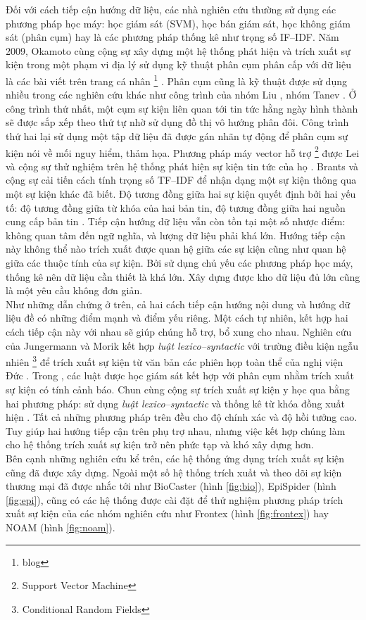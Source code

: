 \noindent Đối với  cách tiếp cận hướng dữ liệu, các nhà nghiên cứu thường sử dụng các phương pháp học máy: học giám sát (SVM), học bán giám sát, học không giám sát (phân cụm) hay là các  phương pháp thống kê như trọng số IF--IDF. Năm 2009, Okamoto cùng cộng sự xây dựng một hệ thống phát hiện và trích xuất sự kiện trong một phạm vi địa lý sử dụng kỹ thuật  phân cụm phân cấp với dữ liệu là các bài viết trên trang cá nhân \footnote{blog} \cite{MM09}. Phân cụm cũng là kỹ thuật được sử dụng nhiều trong các nghiên cứu khác như công trình của nhóm  Liu \cite{MYL08}, nhóm Tanev \cite{HJM08}. Ở công trình thứ nhất, một cụm sự kiện liên quan tới tin tức hằng ngày  hình thành sẽ được sắp xếp theo thứ tự nhờ sử dụng đồ thị vô hướng phân đôi. Công trình thứ hai lại sử dụng một tập dữ liệu đã được gán nhãn tự động để phân cụm sự kiện nói về mối nguy hiểm, thảm họa. Phương pháp máy vector hỗ trợ \footnote{Support Vector Machine} được Lei và cộng sự thử nghiệm trên hệ thống phát hiện sự kiện tin tức của họ \cite{LWZ05}. Brants và cộng sự cải tiến cách tính  trọng số TF--IDF để nhận dạng một sự kiện thông qua một sự kiện khác đã biết. Độ tương đồng giữa hai sự kiện quyết định bởi hai yếu tố: độ tương đồng giữa từ khóa của hai bản tin, độ tương đồng giữa hai nguồn cung cấp bản tin \cite{TFA03}. Tiếp cận hướng dữ liệu vẫn còn tồn tại một số nhược điểm: không quan tâm đến ngữ nghĩa, và lượng dữ liệu phải khá lớn. Hướng tiếp cận này không thể nào trích xuất được quan hệ giữa các sự kiện cũng như quan hệ giữa các thuộc tính của sự kiện. Bởi sử dụng chủ yếu các phương pháp học máy, thống kê nên dữ liệu cần thiết là khá lớn. Xây dựng được kho dữ liệu đủ lớn cũng là một yêu cầu không đơn giản.
\\
\noindent Như những dẫn chứng ở trên, cả hai cách tiếp cận hướng nội dung và hướng dữ liệu đề có những điểm mạnh và điểm yếu riêng. Một cách tự nhiên, kết hợp hai cách tiếp cận này với nhau sẽ giúp chúng hỗ trợ, bổ xung cho nhau. Nghiên cứu của Jungermann và Morik kết hợp \emph{luật lexico--syntactic} với trường điều kiện ngẫu nhiên \footnote{Conditional Random Fields} để trích xuất sự kiện từ văn bản các phiên họp toàn thể của nghị viện Đức \cite{FK08}. Trong \cite{JHP07}, các luật được học giám sát kết hợp với phân cụm nhằm trích xuất sự kiện có tính cảnh báo. Chun cùng cộng sự trích xuất sự kiện y học qua bằng hai phương pháp: sử dụng \emph{luật lexico--syntactic} và thống kê từ khóa đồng xuất hiện \cite{CHR04}. Tất cả những phương pháp trên đều cho độ chính xác và độ hồi tưởng cao. Tuy giúp hai hướng tiếp cận trên phụ trợ nhau, nhưng việc kết hợp chúng làm cho hệ thống trích xuất sự kiện trở nên phức tạp và khó xây dựng hơn.
\\
\noindent Bên cạnh những nghiên cứu kể trên, các hệ thống ứng dụng trích xuất sự kiện cũng đã được xây dựng. Ngoài một số hệ thống trích xuất và theo dõi sự kiện thương mại đã được nhắc tới như BioCaster (hình \ref{fig:bio}), EpiSpider (hình \ref{fig:epi}), cũng có các hệ thống được cài đặt để thử nghiệm phương pháp trích xuất sự kiện của các nhóm nghiên cứu như Frontex \cite{JM11}(hình \ref{fig:frontex}) hay NOAM \cite{FIM11} (hình \ref{fig:noam}). 

